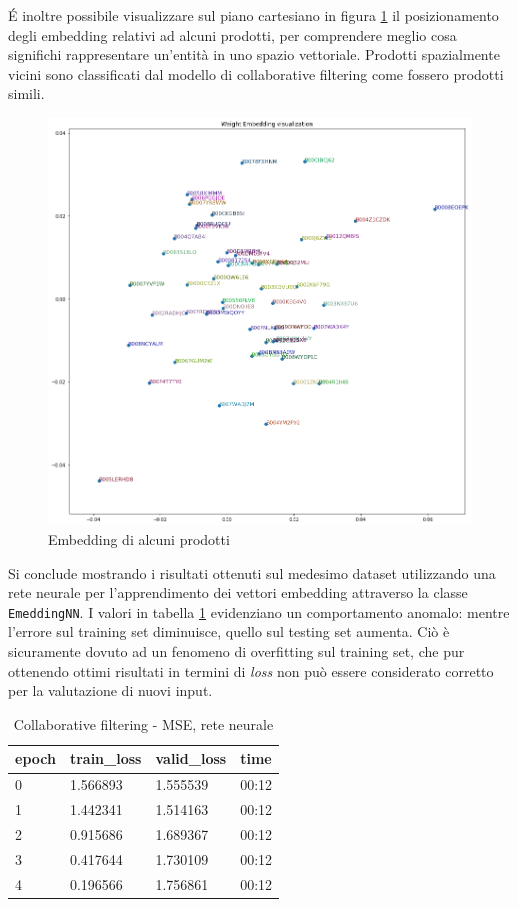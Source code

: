 \documentclass[hidelinks, 12pt]{article}
\begin{document}
É inoltre possibile visualizzare sul piano cartesiano in figura \ref{fig:embedding-chart} il posizionamento degli embedding relativi ad alcuni prodotti, per comprendere meglio cosa significhi rappresentare un'entità in uno spazio vettoriale. Prodotti spazialmente vicini sono classificati dal modello di collaborative filtering come fossero prodotti simili.

\begin{figure}[H]
	\centering
	\includegraphics[scale=0.32]{images/07_04_embeddings.png}
	\caption[Embedding di alcuni prodotti]{Embedding di alcuni prodotti}
	\label{fig:embedding-chart}
\end{figure}


Si conclude mostrando i risultati ottenuti sul medesimo dataset utilizzando una rete neurale per l'apprendimento dei vettori embedding attraverso la classe \texttt{EmeddingNN}. I valori in tabella \ref{tab:collab-nn-loss} evidenziano un comportamento anomalo: mentre l'errore sul training set diminuisce, quello sul testing set aumenta. Ciò è sicuramente dovuto ad un fenomeno di overfitting sul training set, che pur ottenendo ottimi risultati in termini di \textit{loss} non può essere considerato corretto per la valutazione di nuovi input.

\begin{table}[H]
	\caption{Collaborative filtering - MSE, rete neurale}\label{tab:collab-nn-loss}
	\centering
	\begin{tabular}{|l|l|l|l|}
		\hline
		epoch & train\_loss & valid\_loss & time \\
		\hline
		0 & 1.566893 & 1.555539 & 00:12 \\
		1 & 1.442341 & 1.514163 & 00:12 \\
		2 & 0.915686 & 1.689367 & 00:12 \\
		3 & 0.417644 & 1.730109 & 00:12 \\
		4 & 0.196566 & 1.756861 & 00:12 \\
		\hline
	\end{tabular}
\end{table}
\end{document}
